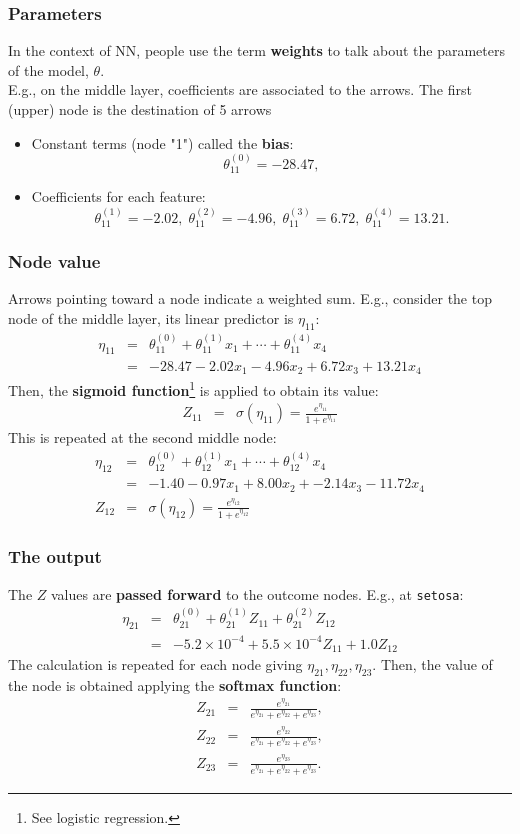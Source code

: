 \begin{frame}
\frametitle{Parameters}
In the context of NN, people use the term {\bf weights} to talk about the parameters of the model, $\theta$.\\
\vspace{0.3cm}
E.g., on the middle layer, coefficients are associated to the arrows. The first (upper) node is the destination of 5 arrows
\begin{itemize}
\item Constant terms (node "1") called the {\bf bias}:
$$
\theta_{11}^{(0)}=-28.47,
$$
\item Coefficients for each feature:
$$
\theta_{11}^{(1)}=-2.02,\; \theta_{11}^{(2)}=-4.96,\; \theta_{11}^{(3)}=6.72,\; \theta_{11}^{(4)}=13.21.
$$
\end{itemize}
\end{frame}
\begin{frame}
\frametitle{Node value}
Arrows pointing toward a node indicate a weighted sum. E.g., consider the top node of the middle layer, its linear predictor is $\eta_{11}$:
\begin{eqnarray*}
\eta_{11} &=& \theta_{11}^{(0)} + \theta_{11}^{(1)} x_1 + \cdots + \theta_{11}^{(4)} x_4\\
&=& -28.47 - 2.02 x_1 - 4.96 x_2 + 6.72 x_3 + 13.21 x_4
\end{eqnarray*}
Then, the {\bf sigmoid function}\footnote{See logistic regression.} is applied to obtain its value:
\begin{eqnarray*}
Z_{11} &=& \sigma(\eta_{11}) = \frac{e^{\eta_{11}}}{1+e^{\eta_{11}}}
\end{eqnarray*}
This is repeated at the second middle node:
\begin{eqnarray*}
\eta_{12} &=& \theta_{12}^{(0)} + \theta_{12}^{(1)} x_1 + \cdots + \theta_{12}^{(4)} x_4\\
&=& -1.40 -0.97 x_1 + 8.00 x_2 + -2.14 x_3 - 11.72 x_4\\
Z_{12} &=& \sigma(\eta_{12}) = \frac{e^{\eta_{12}}}{1+e^{\eta_{12}}}
\end{eqnarray*}
\end{frame}
\begin{frame}
\frametitle{The output}
The $Z$ values are {\bf passed forward} to the outcome nodes. E.g., at {\tt setosa}:
\begin{eqnarray*}
\eta_{21} &=& \theta_{21}^{(0)} + \theta_{21}^{(1)} Z_{11} + \theta_{21}^{(2)} Z_{12} \\
 &=& -5.2\times 10^{-4} + 5.5\times 10^{-4} Z_{11} + 1.0 Z_{12}
\end{eqnarray*}
The calculation is repeated for each node giving $\eta_{21}, \eta_{22}, \eta_{23}$. Then, the value of the node is obtained applying the {\bf softmax function}:
\begin{eqnarray*}
Z_{21} &=& \frac{e^{\eta_{21}}}{e^{\eta_{21}}+e^{\eta_{22}}+e^{\eta_{23}}},\\
Z_{22} &=& \frac{e^{\eta_{22}}}{e^{\eta_{21}}+e^{\eta_{22}}+e^{\eta_{23}}},\\
Z_{23} &=& \frac{e^{\eta_{23}}}{e^{\eta_{21}}+e^{\eta_{22}}+e^{\eta_{23}}}.
\end{eqnarray*}
\end{frame}
